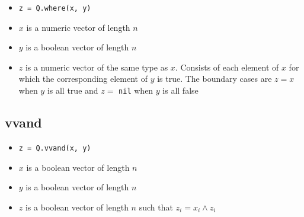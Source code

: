 \begin{itemize}
\item \verb+z = Q.where(x, y)+ 
\item \(x\) is a numeric vector of length \(n\)
\item \(y\) is a boolean vector of length \(n\)
\item \(z\) is a numeric vector of the same type as \(x\). Consists of each
element of \(x\) for which the corresponding element of \(y\) is true. The
boundary cases are \(z = x\) when \(y\) is all true and \(z =\) {\tt nil} when
\(y\) is all false
\end{itemize}

\subsection{vvand}
\label{vvand}

\begin{itemize}
\item \verb+z = Q.vvand(x, y)+ 
\item \(x\) is a boolean vector of length \(n\)
\item \(y\) is a boolean vector of length \(n\)
\item \(z\) is a boolean vector of length \(n\) such that \(z_i = x_i \wedge z_i\)
\end{itemize}

